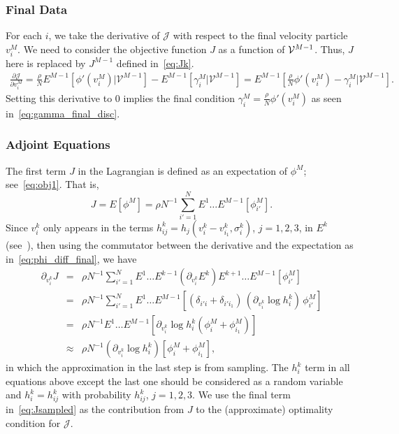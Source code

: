 \documentclass[12pt,nopreprintline]{elsarticle}
\begin{document}
\subsubsection{Final Data}
For each $i$,  we take the derivative of $\mathcal J$ with respect to the final velocity particle $v_i^M$. We need to consider the objective function $J$ as a function of $\mathcal V^{M-1}$. Thus, $J$ here is replaced by $J^{M-1}$ defined in~\eqref{eq:Jk}.
\begin{eqnarray*}
\frac{\partial \mathcal{J}}{\partial v_i^M} 
=  \frac{\rho}{N}  E^{M-1} \left[   \phi' (v_i^M)  |  \mathcal{V}^{M-1} \right] -  E^{M-1}  \left[ \gamma_i^M | \mathcal{V}^{M-1}\right] =   E^{M-1}  \left[ \frac{\rho}{N}\phi' (v_i^M) - \gamma_i^M  \Big| \mathcal{V}^{M-1} \right]. %
\end{eqnarray*}
Setting this derivative to $0$ implies the final condition
$ \gamma_i^M= \frac{\rho}{N} \phi' (v_i^M) $ as seen in~\eqref{eq:gamma_final_disc}.



\subsubsection{Adjoint Equations}
The first term $J$ in the Lagrangian is defined as an expectation of $\phi^M$; see~\eqref{eq:obj1}. That is,
\begin{equation*}
J  = E[\phi^M] = \rho N^{-1} \sum^{N}_{i'=1}E^{1} \ldots E^{M-1} [\phi_{i'}^M].
\end{equation*}
Since $v^k_i$  only appears in the terms $h^k_{ij}=h_j (v^k_i -v^k_{i_1}, \sigma_i^k)$, $j=1,2,3$, in $E^k$ (see~), then using the commutator between the derivative and the expectation as in~\eqref{eq:phi_diff_final}, we have
\begin{eqnarray}\label{eq:Jsampled}
\partial_{v^k_i}J  &=& \rho N^{-1} \sum^{N}_{i'=1}E^{1}\ldots E^{k-1} (\partial_{v^k_i}E^{k})E^{k+1}\ldots E^{M-1} [\phi_{i'}^M] \nonumber  \\
&=& \rho N^{-1} \sum^{N}_{i'=1}E^{1}\ldots E^{M-1} \left[ (\delta_{i' i}+\delta_{i' i_1})\, \left( \partial_{v^k_i} \log h_i^k  \right)\,\phi_{i'}^M \right]  \nonumber %
\\
&=& \rho N^{-1} E^{1}\ldots E^{M-1}   \left[ \partial_{v^k_i} \log h_i^k  \left(\phi_{i}^M+\phi_{i_1}^M \right)\right] 
\nonumber %
\\
&\approx& \rho N^{-1} \left( \partial_{v^k_i} \log h_i^k  \right) [\phi_{i}^M+\phi_{i_1}^M], %
\end{eqnarray}
in which the  approximation in the last step is from sampling. The $h_{i}^k$ term in all  equations above except the last one should be considered as a random variable and $h_i^k = h_{ij}^k$ with probability $h_{ij}^k$, $j=1,2,3$. We use the final term in~\eqref{eq:Jsampled} as the contribution from $J$ to the (approximate) optimality condition for $ \mathcal{J}$.
\end{document}
